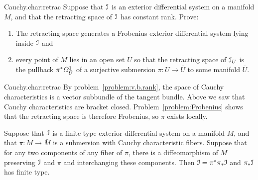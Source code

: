 \begin{problem}{Cauchy.char:retrac}
Suppose that \(\mathcal{I}\) is an exterior differential system on a manifold \(M\), and that the retracting space of \(\mathcal{I}\) has constant rank.
Prove: 
\begin{enumerate}
\item
The retracting space generates a Frobenius exterior differential system lying inside \(\mathcal{I}\) and
\item
every point of \(M\) lies in an open set \(U\) so that the retracting space of \(\mathcal{I}_U\) is the pullback \(\pi^*\Omega^{1}_{\bar{U}}\) of a surjective submersion \(\pi \colon U \to \bar{U}\) to some manifold \(\bar{U}\).
\end{enumerate}
\end{problem}
\begin{answer}{Cauchy.char:retrac}
By problem~\vref{problem:v.b.rank}, the space of Cauchy characteristics is a vector subbundle of the tangent bundle.
Above we saw that Cauchy characteristics are bracket closed.
Problem~\vref{problem:Frobenius} shows that the retracting space is therefore Frobenius, so \(\pi\) exists locally.
\end{answer}
\begin{theorem}\label{theorem:quotient}
Suppose that \(\mathcal{I}\) is a finite type exterior differential system on a manifold \(M\), and that \(\pi \colon M \to \bar{M}\) is a submersion with Cauchy characteristic fibers.
Suppose that for any two components of any fiber of \(\pi\), there is a diffeomorphism of \(M\) preserving \(\mathcal{I}\) and \(\pi\) and interchanging these components.
Then \(\mathcal{I}=\pi^*\pi_*\mathcal{I}\) and \(\pi_*\mathcal{I}\) has finite type.
\end{theorem}
